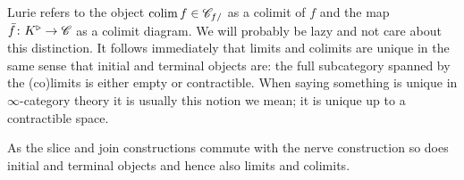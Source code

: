 \documentclass[../../thesis.tex]{subfiles}
\begin{document}
Lurie \cite{HTT} refers to the object $\operatorname{colim} f \in \mathscr{C}_{f/}$ as a colimit of $f$ and the map $\bar{f}\colon K^{\triangleright} \to \mathscr{C}$ as a colimit diagram.
We will probably be lazy and not care about this distinction.
It follows immediately that limits and colimits are unique in the same sense that initial and terminal objects are: the full subcategory spanned by the (co)limits is either empty or contractible.
When saying something is unique in $\infty$-category theory it is usually this notion we mean; it is unique up to a contractible space.
\begin{remark}
    As the slice and join constructions commute with the nerve construction so does initial and terminal objects and hence also limits and colimits.
\end{remark}
\end{document}

